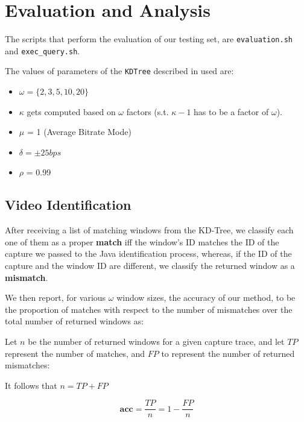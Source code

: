 \chapter{Evaluation and Analysis}\label{sec:results}

The scripts that perform the evaluation of our testing set, are
\texttt{evaluation.sh} and \texttt{exec\_query.sh}.

The values of parameters of the \texttt{KDTree} described in  used are:

\begin{itemize}
    \item $\omega = \{2,3,5,10,20\}$
    \item $\kappa$ gets computed based on $\omega$ factors (s.t. $\kappa - 1$
        has to be a factor of $\omega$).
    \item $\mu$ = 1 (Average Bitrate Mode)
    \item $\delta = \pm 25 bps$
    \item $\rho$ = 0.99
\end{itemize}

\section{Video Identification} 

After receiving a list of matching windows from the KD-Tree, we classify each
one of them as a proper \textbf{match} iff the window's ID matches the ID of
the capture we passed to the Java identification process, whereas, if the ID of
the capture and the window ID are different, we classify the returned window as
a \textbf{mismatch}.

We then report, for various $\omega$ window sizes, the accuracy of our method,
to be the proportion of matches with respect to the number of mismatches over
the total number of returned windows as:

Let $n$ be the number of returned windows for a given capture trace, and let
$TP$ represent the number of matches, and $FP$ to represent the number of
returned mismatches:

It follows that $n = TP + FP$

\begin{equation*}
    \mathbf{acc} = \dfrac{TP}{n} = 1 - \dfrac{FP}{n}
\end{equation*}

